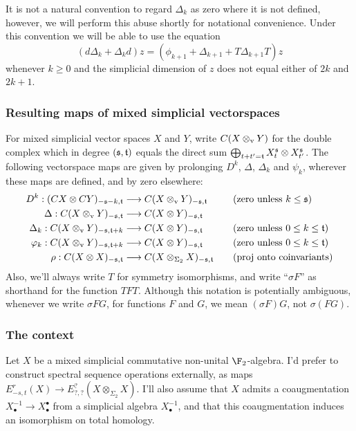 \documentclass[10pt]{article}
\newcommand{\twist}{\sigma}
\begin{document}
\begin{AdamsSSEQ operations final}
It is not a natural convention to regard $\Delta_k$ as zero where it is not defined, however, we will perform this abuse shortly for notational convenience. Under this convention we will be able to use the equation
\[(d\Delta_k+\Delta_kd)z=(\phi_{k+1}+\Delta_{k+1}+T\Delta_{k+1}T)z\]
whenever $k\geq0$ and the simplicial dimension of $z$ does not equal either of $2k$ and $2k+1$.

\subsubsection*{Resulting maps of mixed simplicial vectorspaces}
For mixed simplicial vector spaces $X$ and $Y$, write $C(X\otimes_\textup{v}Y)$ for the double complex which in degree $(\mathfrak{s},\mathfrak{t})$ equals the direct sum $\bigoplus_{t+t'=\mathfrak{t}}X_t^{\mathfrak{s}}\otimes X_{t'}^{\mathfrak{s}}$. The following vectorspace maps are given by prolonging $D^k$, $\Delta$, $\Delta_k$ and $\psi_k$, wherever these maps are defined, and by zero elsewhere:
\begin{align*}
{D}^k:(CX\otimes CY)_{-\mathfrak{s}-k,\mathfrak{t}}&\longrightarrow C(X\otimes_\textup{v}Y)_{-\mathfrak{s},\mathfrak{t}}&\quad&\textup{(zero unless $k\leq \mathfrak{s}$)}\\
{\Delta}:C(X\otimes_\textup{v} Y)_{-\mathfrak{s},\mathfrak{t}}&\longrightarrow C(X\otimes Y)_{-\mathfrak{s},\mathfrak{t}}\\
{\Delta}_k:C(X\otimes_\textup{v} Y)_{-\mathfrak{s},\mathfrak{t}+k}&\longrightarrow C(X\otimes Y)_{-\mathfrak{s},\mathfrak{t}}&\quad&\textup{(zero unless $0\leq k\leq \mathfrak{t}$)}\\
{\varphi}_k:C(X\otimes_\textup{v} Y)_{-\mathfrak{s},\mathfrak{t}+k}&\longrightarrow C(X\otimes Y)_{-\mathfrak{s},\mathfrak{t}}&\quad&\textup{(zero unless $0\leq k\leq \mathfrak{t}$)}\\
{\rho}:C(X\otimes X)_{-\mathfrak{s},\mathfrak{t}}&\longrightarrow C(X\otimes_{\Sigma_2} X)_{-\mathfrak{s},\mathfrak{t}}&\quad&\textup{(proj onto coinvariants)}
\end{align*}
Also, we'll always write $T$ for symmetry isomorphisms, and write ``$\twist F$'' as shorthand for the function $TFT$. Although this notation is potentially ambiguous, whenever we write $\sigma FG$, for functions $F$ and $G$, we mean $(\sigma F)G$, not $\sigma(FG)$.

\subsubsection*{The context}
Let $X$ be a mixed simplicial commutative non-unital $\F_2$-algebra. I'd prefer to construct spectral sequence operations externally, as maps $E^r_{-s,t}(X)\to E^?_{?,?}(X\otimes_{\Sigma_2}X)$. I'll also assume that $X$ admits a coaugmentation $X^{-1}_\bullet\to X^\bullet_\bullet$ from a simplicial algebra $X^{-1}_\bullet$, and that this coaugmentation induces an isomorphism on total homology.


\end{AdamsSSEQ operations final}
\end{document}
